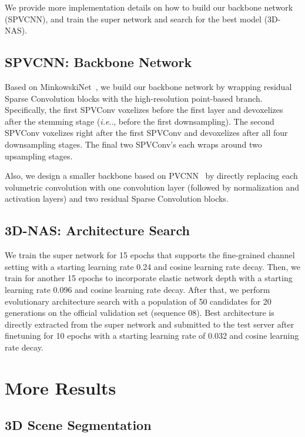 \documentclass[runningheads]{llncs}
\makeatletter
\DeclareRobustCommand\onedot{\futurelet\@let@token\@onedot}
\def\@onedot{\ifx\@let@token.\else.\null\fi\xspace}
\def\ie{\emph{i.e}\onedot} \def\Ie{\emph{I.e}\onedot}
\def\moduleshort{SPVConv\xspace}
\def\cnnshort{SPVCNN\xspace}
\def\nasshort{3D-NAS\xspace}
\makeatother
\begin{document}
We provide more implementation details on how to build our backbone network (\cnnshort), and train the super network and search for the best model (\nasshort).

\subsection{\cnnshort: Backbone Network}

Based on MinkowskiNet~\cite{choy20194d}, we build our backbone network by wrapping residual Sparse Convolution blocks with the high-resolution point-based branch. Specifically, the first \moduleshort voxelizes before the first layer and devoxelizes after the stemming stage (\ie, before the first downsampling). The second \moduleshort voxelizes right after the first \moduleshort and devoxelizes after all four downsampling stages. The final two \moduleshort's each wraps around two upsampling stages.

Also, we design a smaller backbone based on PVCNN~\cite{liu2019point} by directly replacing each volumetric convolution with one convolution layer (followed by normalization and activation layers) and two residual Sparse Convolution blocks.

\subsection{\nasshort: Architecture Search}

We train the super network for 15 epochs that supports the fine-grained channel setting with a starting learning rate 0.24 and cosine learning rate decay. Then, we train for another 15 epochs to incorporate elastic network depth with a starting learning rate 0.096 and cosine learning rate decay. After that, we perform evolutionary architecture search with a population of 50 candidates for 20 generations on the official validation set (sequence 08). Best architecture is directly extracted from the super network and submitted to the test server after finetuning for 10 epochs with a starting learning rate of 0.032 and cosine learning rate decay.

\section{More Results}

\subsection{3D Scene Segmentation}
\end{document}

